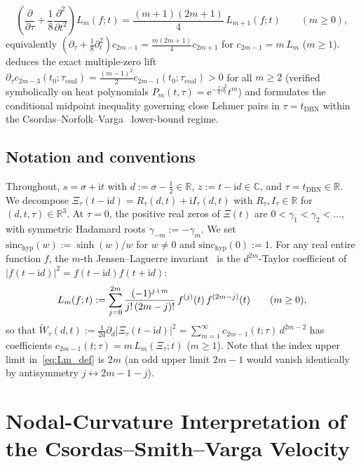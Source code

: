 \documentclass[11pt,reqno]{amsart}
\theoremstyle{plain}
\theoremstyle{definition}
\theoremstyle{remark}
\numberwithin{equation}{section}
\newcommand{\ii}{\mathrm{i}}
\newcommand{\ee}{\mathrm{e}}
\newcommand{\fac}{\mathclose{\mathchar"0021}}
\newcommand{\sinch}{\mathrm{sinc}_{\mathrm{hyp}}}
\begin{document}
\begin{enumerate}[label=\textup{(\arabic*)},leftmargin=2.2em]
\[
\left(\frac{\partial}{\partial\tau} + \frac{1}{8}\frac{\partial^2}{\partial t^2}\right) L_m(f; t) = \frac{(m + 1)(2m + 1)}{4}\,L_{m+1}(f; t) \qquad (m \ge 0),
\]
equivalently $(\partial_\tau + \frac{1}{8}\partial_t^2)c_{2m-1} = \frac{m(2m+1)}{4}c_{2m+1}$ for $c_{2m-1} = m\,L_m$ ($m \ge 1$).  deduces the exact multiple-zero lift $\partial_\tau c_{2m-3}(t_0;\tau_{\mathrm{coal}}) = \frac{(m-1)^2}{2}c_{2m-1}(t_0;\tau_{\mathrm{coal}}) > 0$ for all $m \ge 2$ (verified symbolically on heat polynomials $P_m(t,\tau) = \ee^{-\frac{\tau}{4}\partial_t^2}t^m$) and formulates the conditional midpoint inequality governing close Lehmer pairs in $\tau = t_{\mathrm{DBN}}$ within the Csordas--Norfolk--Varga~\cite{csordas1988} lower-bound regime.
\end{enumerate}

\subsection{Notation and conventions}\label{subsec:notation}

Throughout, $s = \sigma + \ii t$ with $d := \sigma - \frac{1}{2} \in \mathbb{R}$, $z := t - \ii d \in \mathbb{C}$, and $\tau = t_{\mathrm{DBN}} \in \mathbb{R}$. We decompose $\Xi_\tau(t - \ii d) = R_\tau(d,t) + \ii I_\tau(d,t)$ with $R_\tau, I_\tau \in \mathbb{R}$ for $(d,t,\tau) \in \mathbb{R}^3$. At $\tau = 0$, the positive real zeros of $\Xi(t)$ are $0 < \gamma_1 < \gamma_2 < \dots$, with symmetric Hadamard roots $\gamma_{-m} := -\gamma_m$. We set $\sinch(w) := \sinh(w)/w$ for $w \neq 0$ and $\sinch(0) := 1$. For any real entire function $f$, the $m$-th Jensen--Laguerre invariant~\cite{jensen1913,cravencsordas1989} is the $d^{2m}$-Taylor coefficient of $\lvert f(t - \ii d)\rvert^2 = f(t - \ii d)f(t + \ii d)$:
\begin{equation}\label{eq:Lm_def}
L_m(f; t) := \sum_{j=0}^{2m} \frac{(-1)^{j+m}}{j\fac\,(2m - j)\fac}\,f^{(j)}(t)\,f^{(2m-j)}(t) \qquad (m \ge 0),
\end{equation}
so that $\widetilde{W}_\tau(d,t) := \frac{1}{2d}\partial_d\lvert\Xi_\tau(t - \ii d)\rvert^2 = \sum_{m=1}^{\infty} c_{2m-1}(t;\tau)\,d^{2m-2}$ has coefficients $c_{2m-1}(t;\tau) = m\,L_m(\Xi_\tau; t)$ ($m \ge 1$). Note that the index upper limit in~\eqref{eq:Lm_def} is $2m$ (an odd upper limit $2m - 1$ would vanish identically by antisymmetry $j \leftrightarrow 2m - 1 - j$).

\section{Nodal-Curvature Interpretation of the Csordas--Smith--Varga Velocity}\label{sec:velocity}
\end{document}
